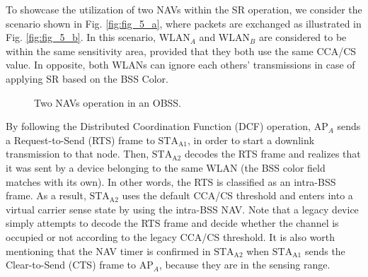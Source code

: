 \documentclass[preprint,12pt]{elsarticle}
\begin{document}
	To showcase the utilization of two NAVs within the SR operation, we consider the scenario shown in Fig. \ref{fig:fig_5_a}, where packets are exchanged as illustrated in Fig. \ref{fig:fig_5_b}. In this scenario, $\text{WLAN}_A$ and $\text{WLAN}_B$ are considered to be within the same sensitivity area, provided that they both use the same CCA/CS value. In opposite, both WLANs can ignore each others' transmissions in case of applying SR based on the BSS Color.
	
	\begin{figure}[ht!]
		\centering
		\hspace{1cm}
		\caption{Two NAVs operation in an OBSS.}
		\label{fig:two_navs}
	\end{figure}
	
	By following the Distributed Coordination Function (DCF) operation, $\text{AP}_A$ sends a Request-to-Send (RTS) frame to $\text{STA}_\text{A1}$, in order to start a downlink transmission to that node. Then, $\text{STA}_\text{A2}$ decodes the RTS frame and realizes that it was sent by a device belonging to the same WLAN (the BSS color field matches with its own). In other words, the RTS is classified as an intra-BSS frame. As a result, $\text{STA}_\text{A2}$ uses the default CCA/CS threshold and enters into a virtual carrier sense state by using the intra-BSS NAV. Note that a legacy device simply attempts to decode the RTS frame and decide whether the channel is occupied or not according to the legacy CCA/CS threshold. It is also worth mentioning that the NAV timer is confirmed in $\text{STA}_\text{A2}$ when $\text{STA}_\text{A1}$ sends the Clear-to-Send (CTS) frame to $\text{AP}_A$, because they are in the sensing range. 
	
\end{document}
